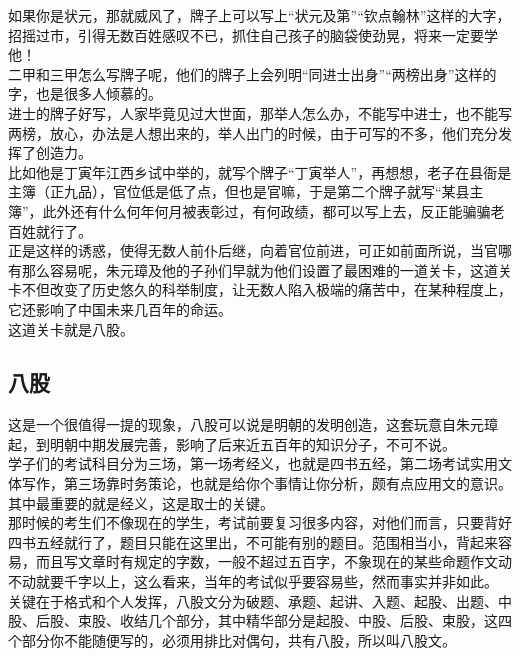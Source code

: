 \begin{multicols}{\theparacolNo}
如果你是状元，那就威风了，牌子上可以写上“状元及第”“钦点翰林”这样的大字，招摇过市，引得无数百姓感叹不已，抓住自己孩子的脑袋使劲晃，将来一定要学他！\\

二甲和三甲怎么写牌子呢，他们的牌子上会列明“同进士出身”“两榜出身”这样的字，也是很多人倾慕的。\\

进士的牌子好写，人家毕竟见过大世面，那举人怎么办，不能写中进士，也不能写两榜，放心，办法是人想出来的，举人出门的时候，由于可写的不多，他们充分发挥了创造力。\\

比如他是丁寅年江西乡试中举的，就写个牌子“丁寅举人”，再想想，老子在县衙是主簿（正九品），官位低是低了点，但也是官嘛，于是第二个牌子就写“某县主簿”，此外还有什么何年何月被表彰过，有何政绩，都可以写上去，反正能骗骗老百姓就行了。\\

正是这样的诱惑，使得无数人前仆后继，向着官位前进，可正如前面所说，当官哪有那么容易呢，朱元璋及他的子孙们早就为他们设置了最困难的一道关卡，这道关卡不但改变了历史悠久的科举制度，让无数人陷入极端的痛苦中，在某种程度上，它还影响了中国未来几百年的命运。\\

这道关卡就是八股。\\

\subsection{八股}
这是一个很值得一提的现象，八股可以说是明朝的发明创造，这套玩意自朱元璋起，到明朝中期发展完善，影响了后来近五百年的知识分子，不可不说。\\

学子们的考试科目分为三场，第一场考经义，也就是四书五经，第二场考试实用文体写作，第三场靠时务策论，也就是给你个事情让你分析，颇有点应用文的意识。其中最重要的就是经义，这是取士的关键。\\

那时候的考生们不像现在的学生，考试前要复习很多内容，对他们而言，只要背好四书五经就行了，题目只能在这里出，不可能有别的题目。范围相当小，背起来容易，而且写文章时有规定的字数，一般不超过五百字，不象现在的某些命题作文动不动就要千字以上，这么看来，当年的考试似乎要容易些，然而事实并非如此。\\

关键在于格式和个人发挥，八股文分为破题、承题、起讲、入题、起股、出题、中股、后股、束股、收结几个部分，其中精华部分是起股、中股、后股、束股，这四个部分你不能随便写的，必须用排比对偶句，共有八股，所以叫八股文。\\


\end{multicols}
